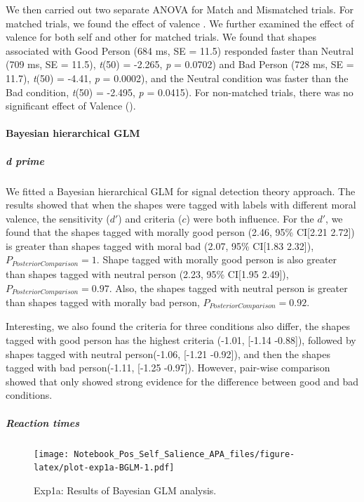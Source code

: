 \documentclass[
  english,
  man]{apa6}
\let\oldparagraph\paragraph
\renewcommand{\paragraph}[1]{\oldparagraph{#1}\mbox{}}
\let\oldsubparagraph\subparagraph
\renewcommand{\subparagraph}[1]{\oldsubparagraph{#1}\mbox{}}
\begin{document}
We then carried out two separate ANOVA for Match and Mismatched trials. For matched trials, we found the effect of valence . We further examined the effect of valence for both self and other for matched trials. We found that shapes associated with Good Person (684 ms, SE = 11.5) responded faster than Neutral (709 ms, SE = 11.5), \emph{t}(50) = -2.265, \emph{p} = 0.0702) and Bad Person (728 ms, SE = 11.7), \emph{t}(50) = -4.41, \emph{p} = 0.0002), and the Neutral condition was faster than the Bad condition, \emph{t}(50) = -2.495, \emph{p} = 0.0415). For non-matched trials, there was no significant effect of Valence ().

\hypertarget{bayesian-hierarchical-glm}{%
\paragraph{Bayesian hierarchical GLM}\label{bayesian-hierarchical-glm}}

\hypertarget{d-prime-1}{%
\subparagraph{d prime}\label{d-prime-1}}

We fitted a Bayesian hierarchical GLM for signal detection theory approach. The results showed that when the shapes were tagged with labels with different moral valence, the sensitivity (\(d'\)) and criteria (\(c\)) were both influence. For the \(d'\), we found that the shapes tagged with morally good person (2.46, 95\% CI{[}2.21 2.72{]}) is greater than shapes tagged with moral bad (2.07, 95\% CI{[}1.83 2.32{]}), \(P_{PosteriorComparison} = 1\). Shape tagged with morally good person is also greater than shapes tagged with neutral person (2.23, 95\% CI{[}1.95 2.49{]}), \(P_{PosteriorComparison} = 0.97\). Also, the shapes tagged with neutral person is greater than shapes tagged with morally bad person, \(P_{PosteriorComparison} = 0.92\).

Interesting, we also found the criteria for three conditions also differ, the shapes tagged with good person has the highest criteria (-1.01, {[}-1.14 -0.88{]}), followed by shapes tagged with neutral person(-1.06, {[}-1.21 -0.92{]}), and then the shapes tagged with bad person(-1.11, {[}-1.25 -0.97{]}). However, pair-wise comparison showed that only showed strong evidence for the difference between good and bad conditions.

\hypertarget{reaction-times-1}{%
\subparagraph{Reaction times}\label{reaction-times-1}}

\begin{figure}
\centering
\texttt{[image: Notebook\_Pos\_Self\_Salience\_APA\_files/figure-latex/plot-exp1a-BGLM-1.pdf]}
\caption{\label{fig:plot-exp1a-BGLM}Exp1a: Results of Bayesian GLM analysis.}
\end{figure}
\end{document}
